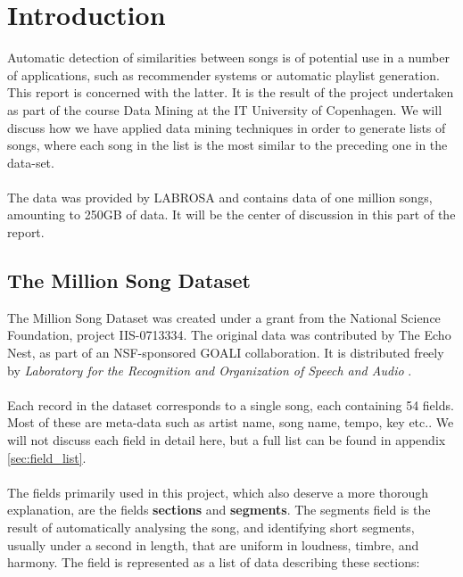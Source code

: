 \section{Introduction} %
\label{sec:introduction}
Automatic detection of similarities between songs is of potential use in a number of applications, such as recommender systems or automatic playlist generation. This report is concerned with the latter. It is the result of the project undertaken as part of the course Data Mining at the IT University of Copenhagen. We will discuss how we have applied data mining techniques in order to generate lists of songs, where each song in the list is the most similar to the preceding one in the data-set.
\\\\
The data was provided by LABROSA and contains data of one million songs, amounting to 250GB of data. It will be the center of discussion in this part of the report.
\subsection{The Million Song Dataset} %
\label{sub:the_million_song_dataset}
The Million Song Dataset was created under a grant from the National Science Foundation, project IIS-0713334. The original data was contributed by The Echo Nest, as part of an NSF-sponsored GOALI collaboration. It is distributed freely by \textit{Laboratory for the Recognition and Organization of Speech and Audio} \citep{bert11}.
\\\\
Each record in the dataset corresponds to a single song, each containing 54 fields. Most of these are meta-data such as artist name, song name, tempo, key etc.. We will not discuss each field in detail here, but a full list can be found in appendix \ref{sec:field_list}.
\\\\
The fields primarily used in this project, which also deserve a more thorough explanation, are the fields \textbf{sections} and \textbf{segments}. The segments field is the result of automatically analysing the song, and identifying short segments, usually under a second in length, that are uniform in loudness, timbre, and harmony. The field is represented as a list of data describing these sections:

